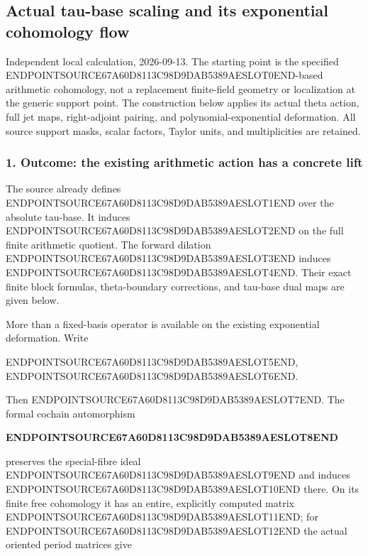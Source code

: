 \subsection{Actual tau-base scaling and its exponential cohomology flow}\label{endpoint-f1_scaling--actual-tau-base-scaling-and-its-exponential-cohomology-flow}

Independent local calculation, 2026-09-13. The starting point is the specified ENDPOINTSOURCE67A60D8113C98D9DAB5389AESLOT0END-based arithmetic cohomology, not a replacement finite-field geometry or localization at the generic support point. The construction below applies its actual theta action, full jet maps, right-adjoint pairing, and polynomial-exponential deformation. All source support masks, scalar factors, Taylor units, and multiplicities are retained.

\subsubsection{1. Outcome: the existing arithmetic action has a concrete lift}\label{endpoint-f1_scaling--outcome-the-existing-arithmetic-action-has-a-concrete-lift}

The source already defines ENDPOINTSOURCE67A60D8113C98D9DAB5389AESLOT1END over the absolute tau-base. It induces ENDPOINTSOURCE67A60D8113C98D9DAB5389AESLOT2END on the full finite arithmetic quotient. The forward dilation ENDPOINTSOURCE67A60D8113C98D9DAB5389AESLOT3END induces ENDPOINTSOURCE67A60D8113C98D9DAB5389AESLOT4END. Their exact finite block formulas, theta-boundary corrections, and tau-base dual maps are given below.

More than a fixed-basis operator is available on the existing exponential deformation. Write

ENDPOINTSOURCE67A60D8113C98D9DAB5389AESLOT5END, ENDPOINTSOURCE67A60D8113C98D9DAB5389AESLOT6END.

Then ENDPOINTSOURCE67A60D8113C98D9DAB5389AESLOT7END. The formal cochain automorphism

\textbf{ENDPOINTSOURCE67A60D8113C98D9DAB5389AESLOT8END}

preserves the special-fibre ideal ENDPOINTSOURCE67A60D8113C98D9DAB5389AESLOT9END and induces ENDPOINTSOURCE67A60D8113C98D9DAB5389AESLOT10END there. On its finite free cohomology it has an entire, explicitly computed matrix ENDPOINTSOURCE67A60D8113C98D9DAB5389AESLOT11END; for ENDPOINTSOURCE67A60D8113C98D9DAB5389AESLOT12END the actual oriented period matrices give

